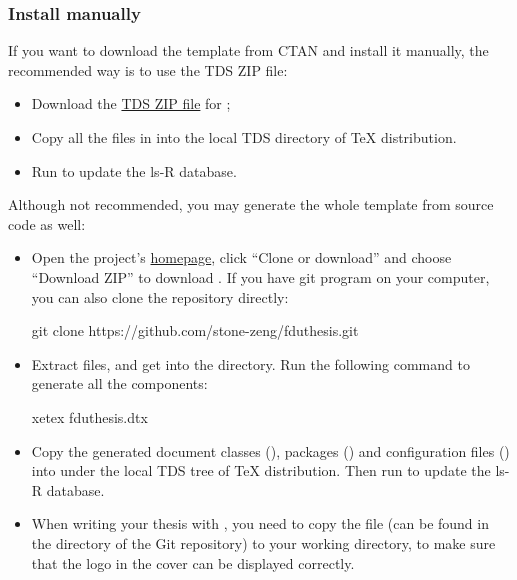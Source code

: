 \documentclass{fdudoc}
\begin{document}
\subsubsection{Install manually}

If you want to download the template from CTAN and install it
manually, the recommended way is to use the TDS ZIP file:
\begin{itemize}
  \item Download the \href{http://mirror.ctan.org/install/macros/latex/contrib/fduthesis.tds.zip}%
    {TDS ZIP file} for ;
  \item Copy all the files in  into the
    local TDS directory of \TeX{} distribution.
  \item Run  to update the ls-R database.
\end{itemize}
Although not recommended, you may generate the whole template
from source code as well:
\begin{itemize}
  \item Open the project's \href{https://github.com/stone-zeng/fduthesis}%
    {homepage}, click ``Clone or download'' and choose
    ``Download ZIP'' to download .
    If you have git program on your computer, you can also
    clone the repository directly:
    \begin{shellexample}[gobble=5,alsoletter={.},%
        morekeywords={git,clone}]
      git clone https://github.com/stone-zeng/fduthesis.git
    \end{shellexample}
  \item Extract files, and get into the  directory.
    Run the following command to generate all the components:
    \begin{shellexample}[gobble=5,morekeywords={xetex}]
      xetex fduthesis.dtx
    \end{shellexample}
  \item Copy the generated document classes (),
    packages () and configuration files ()
    into  under the local
    TDS tree of \TeX{} distribution. Then run 
    to update the ls-R database.
  \item When writing your thesis with , you need
    to copy the file  (can be found in the
     directory of the Git repository) to
    your working directory, to make sure that the logo in the
    cover can be displayed correctly.
\end{itemize}
\end{document}
